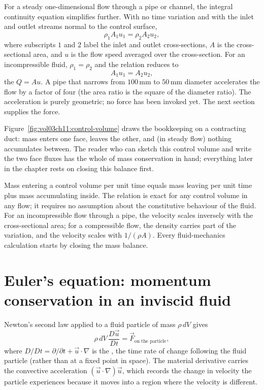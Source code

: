 For a steady one-dimensional flow through a pipe or channel, the
integral continuity equation simplifies further. With no time
variation and with the inlet and outlet streams normal to the
control surface,
\[
\rho_1 A_1 u_1 = \rho_2 A_2 u_2,
\]
where subscripts $1$ and $2$ label the inlet and outlet
cross-sections, $A$ is the cross-sectional area, and $u$ is the
flow speed averaged over the cross-section. For an incompressible
fluid, $\rho_1 = \rho_2$ and the relation reduces to
\[
A_1 u_1 = A_2 u_2,
\]
the  $Q = A u$. A pipe
that narrows from $100\,\si{\milli\meter}$ to $50\,\si{\milli\meter}$
diameter accelerates the flow by a factor of four (the area ratio
is the square of the diameter ratio). The acceleration is purely
geometric; no force has been invoked yet. The next section supplies
the force.



Figure~\ref{fig:vol03ch11:control-volume} draws the bookkeeping on a
contracting duct: mass enters one face, leaves the other, and (in
steady flow) nothing accumulates between. The reader who can sketch
this control volume and write the two face fluxes has the whole of
mass conservation in hand; everything later in the chapter rests on
closing this balance first.

\begin{principle}
Mass entering a control volume per unit time equals mass leaving per
unit time plus mass accumulating inside. The relation is exact for
any control volume in any flow; it requires no assumption about the
constitutive behaviour of the fluid. For an incompressible flow
through a pipe, the velocity scales inversely with the
cross-sectional area; for a compressible flow, the density carries
part of the variation, and the velocity scales with $1/(\rho A)$.
Every fluid-mechanics calculation starts by closing the mass
balance.
\end{principle}

\section{Euler's equation: momentum conservation in an inviscid fluid}

Newton's second law applied to a fluid particle of mass $\rho\,dV$
gives
\[
\rho\,dV\,\frac{D\vec{u}}{Dt} = \vec{F}_{\text{on the particle}},
\]
where $D/Dt = \partial/\partial t + \vec{u}\cdot\nabla$ is the
, the time rate of change following
the fluid particle (rather than at a fixed point in space). The
material derivative carries the convective acceleration
$(\vec{u}\cdot\nabla)\vec{u}$, which records the change in velocity
the particle experiences because it moves into a region where the
velocity is different.

